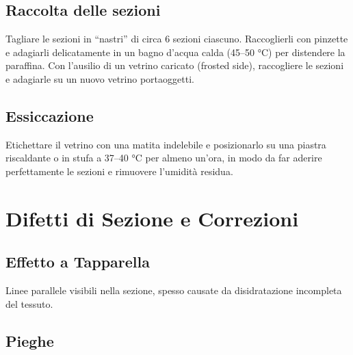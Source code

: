 \subsection{Raccolta delle sezioni}

Tagliare le sezioni in “nastri” di circa 6 sezioni ciascuno. Raccoglierli con pinzette e adagiarli delicatamente in un bagno d'acqua calda (45–50 °C) per distendere la paraffina. Con l'ausilio di un vetrino caricato (frosted side), raccogliere le sezioni e adagiarle su un nuovo vetrino portaoggetti.


\subsection{Essiccazione}

Etichettare il vetrino con una matita indelebile e posizionarlo su una piastra riscaldante o in stufa a 37–40 °C per almeno un'ora, in modo da far aderire perfettamente le sezioni e rimuovere l'umidità residua.




\section{Difetti di Sezione e Correzioni}

\subsection{Effetto a Tapparella}

Linee parallele visibili nella sezione, spesso causate da disidratazione incompleta del tessuto.

\subsection{Pieghe}

